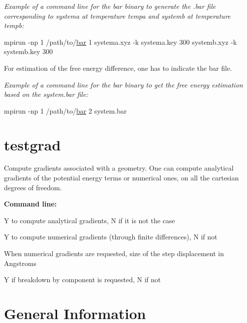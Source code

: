 {\itshape Example of a command line for the bar binary to generate the {\ttfamily .bar} file corresponding to systema at temperature tempa and systemb at temperature tempb\-:}


\begin{DoxyCode}
mpirun -np 1 /path/to/\hyperlink{bar_8f90_a75dfe3f0be9db5c03a0c04398460d0b5}{bar} 1 systema.xyz -k systema.key 300 systemb.xyz -k systemb.key 300
\end{DoxyCode}



\begin{DoxyItemize}
\item For estimation of the free energy difference, one has to indicate the bar file.
\end{DoxyItemize}

{\itshape Example of a command line for the bar binary to get the free energy estimation based on the {\ttfamily system.\-bar} file\-:}


\begin{DoxyCode}
mpirun -np 1 /path/to/\hyperlink{bar_8f90_a75dfe3f0be9db5c03a0c04398460d0b5}{bar} 2 system.bar
\end{DoxyCode}
\hypertarget{md_binaries_doxygen_program_testgrad}{}\section{testgrad}\label{md_binaries_doxygen_program_testgrad}
Compute gradients associated with a geometry. One can compute analytical gradients of the potential energy terms or numerical ones, on all the cartesian degrees of freedom.
\begin{DoxyItemize}
\item {\bfseries Command line\-:}
\begin{DoxyItemize}
\item {\ttfamily Y} to compute analytical gradients, {\ttfamily N} if it is not the case
\item {\ttfamily Y} to compute numerical gradients (through finite differences), {\ttfamily N} if not
\item When numerical gradients are requested, size of the step displacement in Angstroms
\item {\ttfamily Y} if breakdown by component is requested, {\ttfamily N} if not 


\end{DoxyItemize}
\end{DoxyItemize}\hypertarget{md_binaries_doxygen_general_information}{}\section{General Information}\label{md_binaries_doxygen_general_information}


